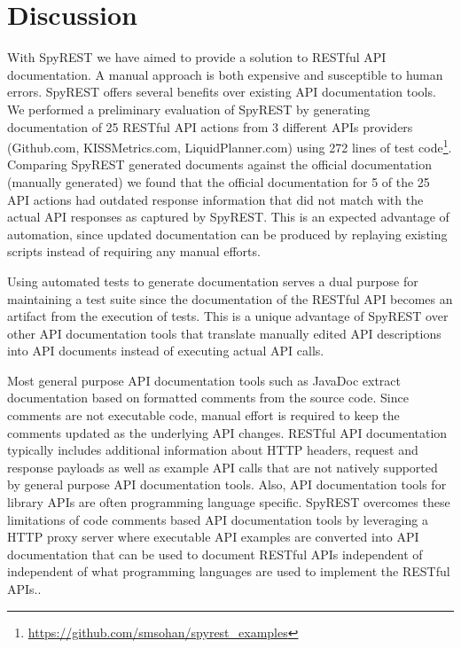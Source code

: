 \documentclass[conference]{IEEEtran}
\begin{document}
\section{Discussion}
With SpyREST we have aimed to provide a solution to RESTful API documentation. A manual approach is both expensive and susceptible to human errors. SpyREST offers several benefits over existing API documentation tools. We performed a preliminary evaluation of SpyREST by generating documentation of 25 RESTful API actions from 3 different APIs providers (Github.com, KISSMetrics.com, LiquidPlanner.com) using 272 lines of test code\footnote{\url{https://github.com/smsohan/spyrest_examples}}. Comparing SpyREST generated documents against the official documentation (manually generated) we found that the official documentation for 5 of the 25 API actions had outdated response information that did not match with the actual API responses as captured by SpyREST. This is an expected advantage of automation, since updated documentation can be produced by replaying existing scripts instead of requiring any manual efforts.

Using automated tests to generate documentation serves a dual purpose for maintaining a test suite since the documentation of the RESTful API becomes an artifact from the execution of tests. This is a unique advantage of SpyREST over other API documentation tools that translate manually edited API descriptions into API documents instead of executing actual API calls.

Most general purpose API documentation tools such as JavaDoc extract documentation based on formatted comments from the source code. Since comments are not executable code, manual effort is required to keep the comments updated as the underlying API changes. RESTful API documentation typically includes additional information about HTTP headers, request and response payloads as well as example API calls that are not natively supported by general purpose API documentation tools. Also, API documentation tools for library APIs are often programming language specific. SpyREST overcomes these limitations of code comments based API documentation tools by leveraging a HTTP proxy server where executable API examples are converted into API documentation that can be used to document RESTful APIs independent of independent of what programming languages are used to implement the RESTful APIs..
\end{document}
